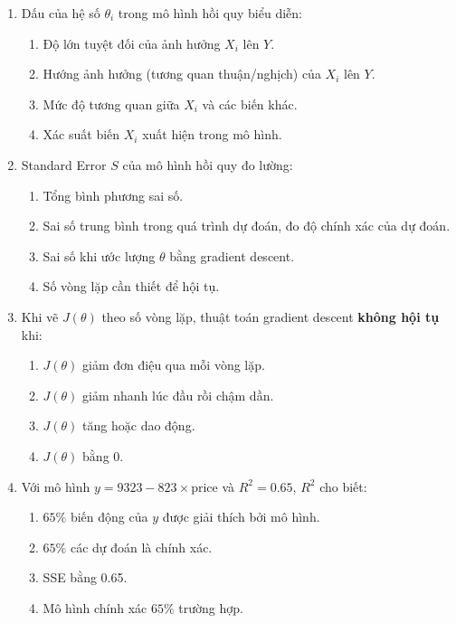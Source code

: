 \documentclass[10pt]{article}
\begin{document}
\begin{enumerate}[leftmargin=*, label=\textbf{Câu \arabic*.}]
    \item Dấu của hệ số $\theta_i$ trong mô hình hồi quy biểu diễn:
    \begin{enumerate}[label=\Alph*.]
        \item Độ lớn tuyệt đối của ảnh hưởng $X_i$ lên $Y$.
        \item Hướng ảnh hưởng (tương quan thuận/nghịch) của $X_i$ lên $Y$.
        \item Mức độ tương quan giữa $X_i$ và các biến khác.
        \item Xác suất biến $X_i$ xuất hiện trong mô hình.
    \end{enumerate}

    \item Standard Error $S$ của mô hình hồi quy đo lường:
    \begin{enumerate}[label=\Alph*.]
        \item Tổng bình phương sai số.
        \item Sai số trung bình trong quá trình dự đoán, đo độ chính xác của dự đoán.
        \item Sai số khi ước lượng $\theta$ bằng gradient descent.
        \item Số vòng lặp cần thiết để hội tụ.
    \end{enumerate}

    \item Khi vẽ $J(\theta)$ theo số vòng lặp, thuật toán gradient descent \textbf{không hội tụ} khi:
    \begin{enumerate}[label=\Alph*.]
        \item $J(\theta)$ giảm đơn điệu qua mỗi vòng lặp.
        \item $J(\theta)$ giảm nhanh lúc đầu rồi chậm dần.
        \item $J(\theta)$ tăng hoặc dao động.
        \item $J(\theta)$ bằng 0.
    \end{enumerate}

    \item Với mô hình $y = 9323 - 823 \times \text{price}$ và $R^2 = 0.65$, $R^2$ cho biết:
    \begin{enumerate}[label=\Alph*.]
        \item $65\%$ biến động của $y$ được giải thích bởi mô hình.
        \item $65\%$ các dự đoán là chính xác.
        \item SSE bằng 0.65.
        \item Mô hình chính xác $65\%$ trường hợp.
    \end{enumerate}


\end{enumerate}
\end{document}
